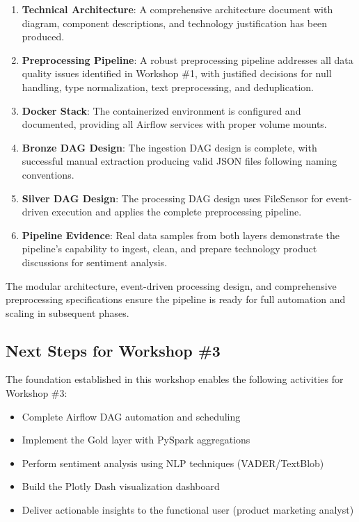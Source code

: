 \documentclass[11pt,a4paper]{article}
\begin{document}
\begin{enumerate}
    \item \textbf{Technical Architecture}: A comprehensive architecture document with diagram, component descriptions, and technology justification has been produced.
    
    \item \textbf{Preprocessing Pipeline}: A robust preprocessing pipeline addresses all data quality issues identified in Workshop \#1, with justified decisions for null handling, type normalization, text preprocessing, and deduplication.
    
    \item \textbf{Docker Stack}: The containerized environment is configured and documented, providing all Airflow services with proper volume mounts.
    
    \item \textbf{Bronze DAG Design}: The ingestion DAG design is complete, with successful manual extraction producing valid JSON files following naming conventions.
    
    \item \textbf{Silver DAG Design}: The processing DAG design uses FileSensor for event-driven execution and applies the complete preprocessing pipeline.
    
    \item \textbf{Pipeline Evidence}: Real data samples from both layers demonstrate the pipeline's capability to ingest, clean, and prepare technology product discussions for sentiment analysis.
\end{enumerate}

The modular architecture, event-driven processing design, and comprehensive preprocessing specifications ensure the pipeline is ready for full automation and scaling in subsequent phases.

\subsection{Next Steps for Workshop \#3}

The foundation established in this workshop enables the following activities for Workshop \#3:
\begin{itemize}
    \item Complete Airflow DAG automation and scheduling
    \item Implement the Gold layer with PySpark aggregations
    \item Perform sentiment analysis using NLP techniques (VADER/TextBlob)
    \item Build the Plotly Dash visualization dashboard
    \item Deliver actionable insights to the functional user (product marketing analyst)
\end{itemize}
\end{document}
